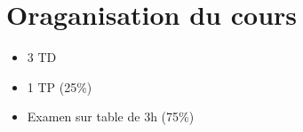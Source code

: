 \chapter*{Oraganisation du cours}

\begin{itemize}
    \item 3 TD
    \item 1 TP (25\%)
    \item Examen sur table de 3h (75\%)
\end{itemize}

